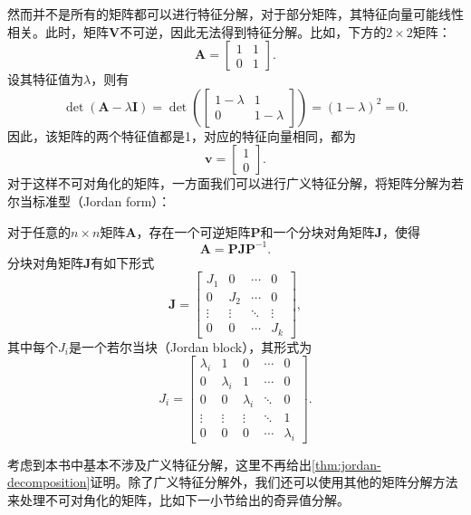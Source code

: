 然而并不是所有的矩阵都可以进行特征分解，对于部分矩阵，其特征向量可能线性相关。此时，矩阵\( \mathbf{V} \)不可逆，因此无法得到特征分解。比如，下方的\( 2 \times 2 \)矩阵：
\[
    \mathbf{A} =
    \begin{bmatrix}
        1 & 1 \\
        0 & 1
    \end{bmatrix}.
\]
设其特征值为\( \lambda \)，则有
\[
    \det(\mathbf{A} - \lambda \mathbf{I}) = \det\left(
    \begin{bmatrix}
            1 - \lambda & 1           \\
            0           & 1 - \lambda
        \end{bmatrix}\right) = (1 - \lambda)^2 = 0.
\]
因此，该矩阵的两个特征值都是1，对应的特征向量相同，都为
\[
    \bm{v} =
    \begin{bmatrix}
        1 \\
        0
    \end{bmatrix}.
\]
对于这样不可对角化的矩阵，一方面我们可以进行广义特征分解，将矩阵分解为若尔当标准型（Jordan form）：
\begin{theorem}[广义特征分解] \label{thm:jordan-decomposition}
    对于任意的\( n \times n \)矩阵\( \mathbf{A} \)，存在一个可逆矩阵\( \mathbf{P} \)和一个分块对角矩阵\( \mathbf{J} \)，使得
    \[
        \mathbf{A} = \mathbf{P} \mathbf{J} \mathbf{P}^{-1}.
    \]
    分块对角矩阵\( \mathbf{J} \)有如下形式
    \[
        \mathbf{J} =
        \begin{bmatrix}
            J_1    & 0      & \cdots & 0      \\
            0      & J_2    & \cdots & 0      \\
            \vdots & \vdots & \ddots & \vdots \\
            0      & 0      & \cdots & J_k
        \end{bmatrix},
    \]
    其中每个\( J_i \)是一个若尔当块（Jordan block），其形式为
    \[
        J_i =
        \begin{bmatrix}
            \lambda_i & 1         & 0         & \cdots & 0         \\
            0         & \lambda_i & 1         & \cdots & 0         \\
            0         & 0         & \lambda_i & \ddots & 0         \\
            \vdots    & \vdots    & \vdots    & \ddots & 1         \\
            0         & 0         & 0         & \cdots & \lambda_i
        \end{bmatrix}.
    \]
\end{theorem}
考虑到本书中基本不涉及广义特征分解，这里不再给出\cref{thm:jordan-decomposition}证明。除了广义特征分解外，我们还可以使用其他的矩阵分解方法来处理不可对角化的矩阵，比如下一小节给出的奇异值分解。

